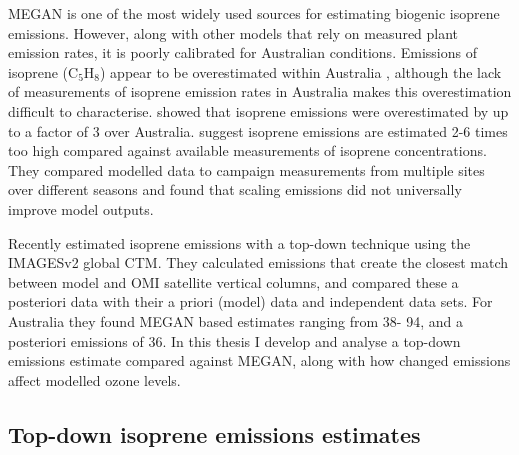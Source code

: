     MEGAN is one of the most widely used sources for estimating biogenic isoprene emissions.
    However, along with other models that rely on measured plant emission rates, it is poorly calibrated for Australian conditions.
    Emissions of isoprene (C$_5$H$_8$) appear to be overestimated within Australia \parencite{Sindelarova2014,Stavrakou2014,Emmerson2016}, although the lack of measurements of isoprene emission rates in Australia makes this overestimation difficult to characterise.
    \textcite{Bauwens2016} showed that isoprene emissions were overestimated by up to a factor of 3 over Australia.
    \textcite{Emmerson2016} suggest isoprene emissions are estimated 2-6 times too high compared against available measurements of isoprene concentrations.
    They compared modelled data to campaign measurements from multiple sites over different seasons and found that scaling emissions did not universally improve model outputs.
    

    Recently \textcite{Bauwens2016} estimated isoprene emissions with a top-down technique using the IMAGESv2 global CTM.
    They calculated emissions that create the closest match between model and OMI satellite vertical columns, and compared these a posteriori data with their a priori (model) data and independent data sets.
    For Australia they found %
    MEGAN based estimates ranging from 38\tgcpyr - 94\tgcpyr, and a posteriori emissions of 36\tgcpyr.
    In this thesis I develop and analyse a top-down emissions estimate compared against MEGAN, along with how changed emissions affect modelled ozone levels.
  
  \subsection{Top-down isoprene emissions estimates}
    \label{BioIsop:intro:top_down_estimates}
    

